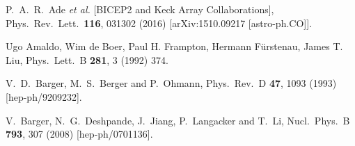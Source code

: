 \documentclass[aps,prd,preprint,superscriptaddress,showpacs,ctexart]{revtex4-1}
\begin{document}
\begin{thebibliography}{10}
 P.~A.~R.~Ade \textit{et al.} {[}BICEP2
and Keck Array Collaborations{]}, %
Phys.\ Rev.\ Lett.\ \textbf{116}, 031302 (2016) %
{[}arXiv:1510.09217 {[}astro-ph.CO{]}{]}. %


 Ugo Amaldo, Wim de Boer, Paul H. Frampton,
Hermann F\"{u}rstenau, James T. Liu, %
Phys.\ Lett.\ B \textbf{281}, 3 (1992) 374. %

 V.~D.~Barger, M.~S.~Berger and P.~Ohmann,
Phys.\ Rev.\ D \textbf{47}, 1093 (1993) %
{[}hep-ph/9209232{]}. %

 V.~Barger, N.~G.~Deshpande, J.~Jiang,
P.~Langacker and T.~Li, %
Nucl.\ Phys.\ B \textbf{793}, 307 (2008) %
{[}hep-ph/0701136{]}. %







\end{thebibliography}
\end{document}
